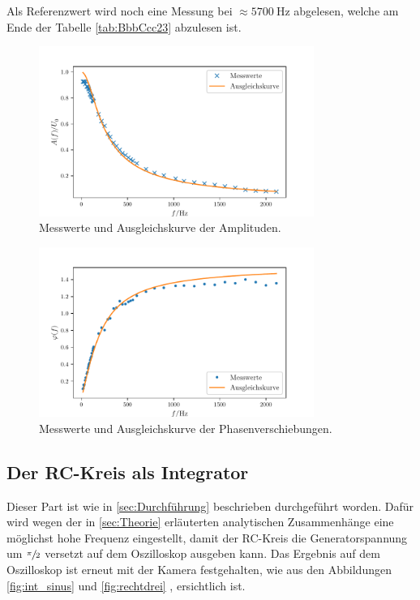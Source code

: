 \FloatBarrier

Als Referenzwert wird noch eine Messung bei $\approx \SI{5700}{\hertz}$ abgelesen, welche am Ende der Tabelle \ref{tab:BbbCcc23} abzulesen ist.

\begin{figure}
    \centering
    \includegraphics[width=0.8\textwidth]{plots/plot_b.pdf}
    \caption{Messwerte und Ausgleichskurve der Amplituden.}
    \label{fig:mess_b}
\end{figure}

\begin{figure}
    \centering
    \includegraphics[width=0.8\textwidth]{plots/plot_c.pdf}
    \caption{Messwerte und Ausgleichskurve der Phasenverschiebungen.}
    \label{fig:mess_c}
\end{figure}

\FloatBarrier

\subsection{Der RC-Kreis als Integrator}

Dieser Part ist wie in \ref{sec:Durchführung} beschrieben durchgeführt worden. 
Dafür wird wegen der in \ref{sec:Theorie} erläuterten analytischen Zusammenhänge eine möglichst hohe Frequenz eingestellt, 
damit der RC-Kreis die Generatorspannung um $\sfrac{\pi}{2}$ versetzt auf dem Oszilloskop ausgeben kann. 
Das Ergebnis auf dem Oszilloskop ist erneut mit der Kamera festgehalten, wie aus den Abbildungen \ref{fig:int_sinus} und 
\ref{fig:rechtdrei} ,  ersichtlich ist. 

